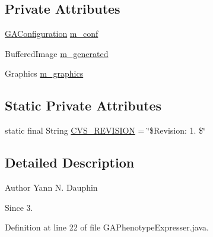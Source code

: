 \subsection*{Private Attributes}
\begin{DoxyCompactItemize}
\item 
\hyperlink{classexamples_1_1monalisa_1_1core_1_1_g_a_configuration}{G\-A\-Configuration} \hyperlink{classexamples_1_1monalisa_1_1core_1_1_g_a_phenotype_expresser_aee9757424a4462c17cab1255b30499e6}{m\-\_\-conf}
\item 
Buffered\-Image \hyperlink{classexamples_1_1monalisa_1_1core_1_1_g_a_phenotype_expresser_aeae59439813b0a07fc08be1ab4542d70}{m\-\_\-generated}
\item 
Graphics \hyperlink{classexamples_1_1monalisa_1_1core_1_1_g_a_phenotype_expresser_a1a07330141a226465b6545edb3bc0710}{m\-\_\-graphics}
\end{DoxyCompactItemize}
\subsection*{Static Private Attributes}
\begin{DoxyCompactItemize}
\item 
static final String \hyperlink{classexamples_1_1monalisa_1_1core_1_1_g_a_phenotype_expresser_a54392e4e1a103109a552c5245cbab741}{C\-V\-S\-\_\-\-R\-E\-V\-I\-S\-I\-O\-N} = \char`\"{}\$Revision\-: 1. \$\char`\"{}
\end{DoxyCompactItemize}


\subsection{Detailed Description}
\begin{DoxyAuthor}{Author}
Yann N. Dauphin 
\end{DoxyAuthor}
\begin{DoxySince}{Since}
3. 
\end{DoxySince}


Definition at line 22 of file G\-A\-Phenotype\-Expresser.\-java.



